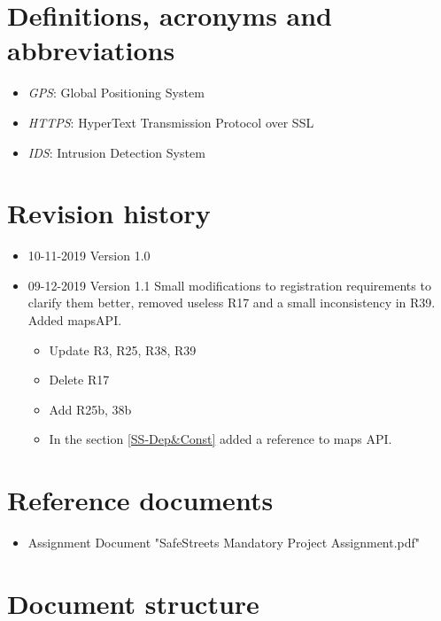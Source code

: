\documentclass[a4paper]{report}
\begin{document}
\section{Definitions, acronyms and abbreviations}
\begin{itemize}
\item \textit{GPS}: Global Positioning System
\item \textit{HTTPS}: HyperText Transmission Protocol over SSL
\item \textit{IDS}: Intrusion Detection System
\end{itemize}
\section{Revision history}
\begin{itemize}
\item 10-11-2019 Version 1.0
\item 09-12-2019 Version 1.1 Small modifications to registration requirements to clarify them better, removed useless R17 and a small inconsistency in R39. Added mapsAPI.
	\begin{itemize} 
	\item Update R3, R25, R38, R39 
	\item Delete R17 
	\item Add R25b, 38b
	\item In the section \ref{SS-Dep&Const} added a reference to maps API.
	\end{itemize}
	
\end{itemize}
\section{Reference documents}
\begin{itemize}
\item Assignment Document "SafeStreets Mandatory Project Assignment.pdf"
\end{itemize}
\section{Document structure}
\end{document}
